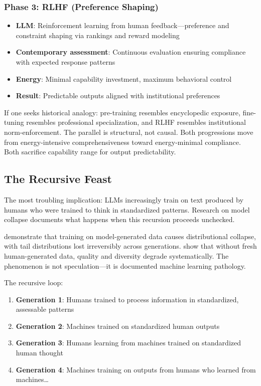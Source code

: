 \subsubsection{Phase 3: RLHF (Preference Shaping)}
\begin{itemize}
\item \textbf{LLM}: Reinforcement learning from human feedback---preference and constraint shaping via rankings and reward modeling \citep{ouyang2022}
\item \textbf{Contemporary assessment}: Continuous evaluation ensuring compliance with expected response patterns
\item \textbf{Energy}: Minimal capability investment, maximum behavioral control
\item \textbf{Result}: Predictable outputs aligned with institutional preferences
\end{itemize}

If one seeks historical analogy: pre-training resembles encyclopedic exposure, fine-tuning resembles professional specialization, and RLHF resembles institutional norm-enforcement. The parallel is structural, not causal. Both progressions move from energy-intensive comprehensiveness toward energy-minimal compliance. Both sacrifice capability range for output predictability.

\subsection{The Recursive Feast}

The most troubling implication: LLMs increasingly train on text produced by humans who were trained to think in standardized patterns. Research on model collapse documents what happens when this recursion proceeds unchecked.

\citet{shumailov2024} demonstrate that training on model-generated data causes distributional collapse, with tail distributions lost irreversibly across generations. \citet{alemohammad2024} show that without fresh human-generated data, quality and diversity degrade systematically. The phenomenon is not speculation---it is documented machine learning pathology.

The recursive loop:
\begin{enumerate}
\item \textbf{Generation 1}: Humans trained to process information in standardized, assessable patterns
\item \textbf{Generation 2}: Machines trained on standardized human outputs
\item \textbf{Generation 3}: Humans learning from machines trained on standardized human thought
\item \textbf{Generation 4}: Machines training on outputs from humans who learned from machines\ldots
\end{enumerate}


